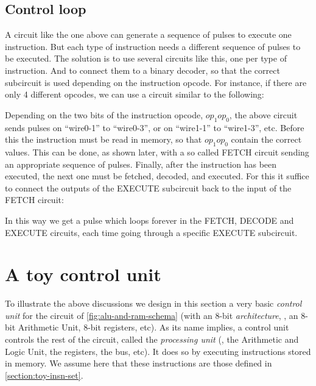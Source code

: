 \subsection{Control loop}

A circuit like the one above can generate a sequence of pulses to execute one
instruction. But each type of instruction needs a different sequence of pulses
to be executed. The solution is to use several circuits like this, one per type
of instruction. And to connect them to a binary decoder, so that the correct
subcircuit is used depending on the instruction opcode. For instance, if there
are only 4 different opcodes, we can use a circuit similar to the following:

\begin{center}
  
\end{center}

Depending on the two bits of the instruction opcode, $op_1op_0$, the above
circuit sends pulses on ``wire0-1'' to ``wire0-3'', or on ``wire1-1'' to
``wire1-3'', etc. Before this the instruction must be read in memory, so that
$op_1op_0$ contain the correct values. This can be done, as shown later, with a
so called FETCH circuit sending an appropriate sequence of pulses. Finally,
after the instruction has been executed, the next one must be fetched, decoded,
and executed. For this it suffice to connect the outputs of the EXECUTE
subcircuit back to the input of the FETCH circuit:

\begin{center}
  
\end{center}

In this way we get a pulse which loops forever in the FETCH, DECODE and EXECUTE
circuits, each time going through a specific EXECUTE subcircuit.

\section{A toy control unit}\label{section:toy-control-unit}

To illustrate the above discussions we design in this section a very basic {\em
control unit} for the circuit of \cref{fig:alu-and-ram-schema} (with an 8-bit
{\em architecture}, \ie, an 8-bit Arithmetic Unit, 8-bit registers, etc). As
its name implies, a control unit controls the rest of the circuit, called the
{\em processing unit} (\ie, the Arithmetic and Logic Unit, the registers, the
bus, etc). It does so by executing instructions stored in memory. We assume
here that these instructions are those defined in \cref{section:toy-insn-set}.

